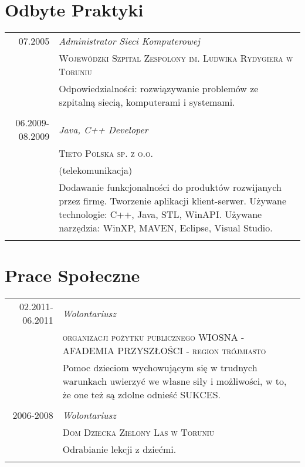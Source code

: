 \documentclass[a4paper,10pt]{article}
\begin{document}
    
\section{Odbyte Praktyki}
\begin{tabular}{r|p{11cm}}
	\textsc{07.2005}
	&\emph{Administrator Sieci Komputerowej} \\
	&\textsc{Wojewódzki Szpital Zespolony im. Ludwika Rydygiera w Toruniu} \\
	&\footnotesize{
		Odpowiedzialności: rozwiązywanie problemów ze szpitalną siecią, komputerami i systemami. 
	}\\
	\multicolumn{2}{c}{} \\
		 			
	\textsc{06.2009-08.2009}
	&\emph{Java, C++ Developer} \\
	&\textsc{Tieto Polska sp. z o.o.} \\
	&(telekomunikacja) \\
	&\footnotesize{
		Dodawanie funkcjonalności do produktów rozwijanych przez firmę. Tworzenie aplikacji klient-serwer. Używane 
		technologie: C++, Java, STL, WinAPI. Używane narzędzia: WinXP, MAVEN, Eclipse, Visual Studio.
	}\\
	\multicolumn{2}{c}{} \\
\end{tabular}

\section{Prace Społeczne}
\begin{tabular}{r|p{11cm}}

	\textsc{02.2011-06.2011}
	&\emph{Wolontariusz} \\
	&\textsc{organizacji pożytku publicznego WIOSNA - AFADEMIA PRZYSZŁOŚCI - region trójmiasto} \\
	&\footnotesize{
		Pomoc dzieciom wychowującym się w trudnych warunkach uwierzyć we własne siły i możliwości, 
		w to, że one też są zdolne odnieść SUKCES.
	} \\
	\multicolumn{2}{c}{} \\

	\textsc{2006-2008}
	&\emph{Wolontariusz} \\
	&\textsc{Dom Dziecka Zielony Las w Toruniu} \\
	&\footnotesize{Odrabianie lekcji z dziećmi.} \\
	\multicolumn{2}{c}{} \
\end{tabular}
	
\end{document}
